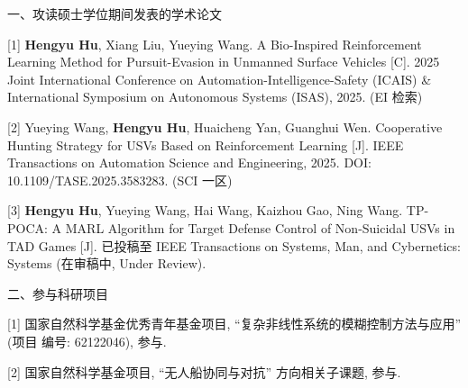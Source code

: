 \begin{publications}

{\heiti 一、攻读硕士学位期间发表的学术论文}

[1] \textbf{Hengyu Hu}, Xiang Liu, Yueying Wang. A Bio-Inspired Reinforcement
Learning Method for Pursuit-Evasion in Unmanned Surface Vehicles [C]. 2025 Joint
International Conference on Automation-Intelligence-Safety (ICAIS) \&
International Symposium on Autonomous Systems (ISAS), 2025. (EI 检索)

[2] Yueying Wang, \textbf{Hengyu Hu}, Huaicheng Yan, Guanghui Wen. Cooperative
Hunting Strategy for USVs Based on Reinforcement Learning [J]. IEEE Transactions
on Automation Science and Engineering, 2025. DOI: 10.1109/TASE.2025.3583283. (SCI
一区)

[3] \textbf{Hengyu Hu}, Yueying Wang, Hai Wang, Kaizhou Gao, Ning Wang.
TP-POCA: A MARL Algorithm for Target Defense Control of Non-Suicidal USVs in
TAD Games [J]. 已投稿至 IEEE Transactions on Systems, Man, and Cybernetics:
Systems (在审稿中, Under Review).

{\heiti 二、参与科研项目}

[1] 国家自然科学基金优秀青年基金项目, ``复杂非线性系统的模糊控制方法与应用'' (项目
编号: 62122046), 参与.

[2] 国家自然科学基金项目, ``无人船协同与对抗'' 方向相关子课题, 参与.

\end{publications}
